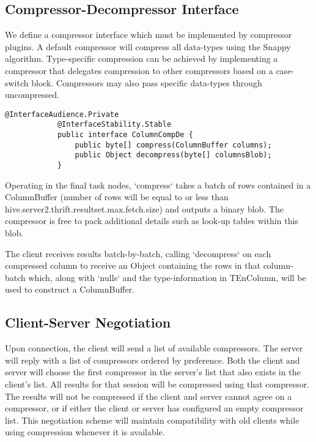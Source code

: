 \documentclass[11pt,a4paper]{article}
\begin{document}
	\subsection{Compressor-Decompressor Interface}
		We define a compressor interface which must be implemented by compressor plugins.
		A default compressor will compress all data-types using the Snappy algorithm.
		Type-specific compression can be achieved by implementing a compressor that delegates compression to other compressors based on a case-switch block.
		Compressors may also pass specific data-types through uncompressed.
		
		\begin{lstlisting}[title=org.apache.hive.service.cli.CompDe; CompDe.java,gobble=6,otherkeywords={ColumnBuffer,Object}]
			@InterfaceAudience.Private
			@InterfaceStability.Stable
			public interface ColumnCompDe {
				public byte[] compress(ColumnBuffer columns);
				public Object decompress(byte[] columnsBlob);
			}
		\end{lstlisting}
		
		Operating in the final task nodes, `compress` takes a batch of rows contained in a ColumnBuffer (number of rows will be equal to or less than \linebreak hive.server2.thrift.resultset.max.fetch.size) and outputs a binary blob.
		The compressor is free to pack additional details such as look-up tables within this blob.
		
		The client receives results batch-by-batch, calling `decompress` on each compressed column to receive an Object containing the rows in that column-batch which, along with `nulls` and the type-information in TEnColumn, will be used to construct a ColumnBuffer.
		
	\subsection{Client-Server Negotiation}
		Upon connection, the client will send a list of available compressors. The server will reply with a list of compressors ordered by preference.
		Both the client and server will choose the first compressor in the server's list that also exists in the client's list.
		All results for that session will be compressed using that compressor.
		The results will not be compressed if the client and server cannot agree on a compressor, or if either the client or server has configured an empty compressor list.
		This negotiation scheme will maintain compatibility with old clients while using compression whenever it is available.
		
\end{document}

